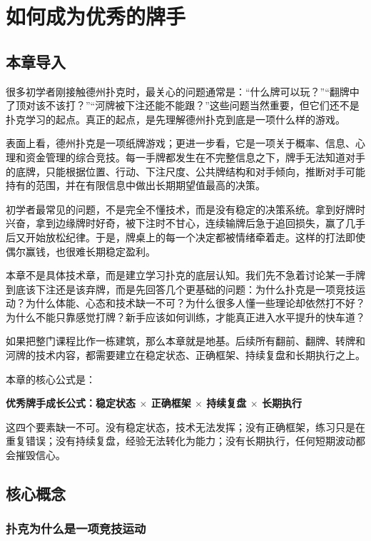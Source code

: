 \chapter{如何成为优秀的牌手}

\section{本章导入}

很多初学者刚接触德州扑克时，最关心的问题通常是：“什么牌可以玩？”“翻牌中了顶对该不该打？”“河牌被下注还能不能跟？”这些问题当然重要，但它们还不是扑克学习的起点。真正的起点，是先理解德州扑克到底是一项什么样的游戏。

表面上看，德州扑克是一项纸牌游戏；更进一步看，它是一项关于概率、信息、心理和资金管理的综合竞技。每一手牌都发生在不完整信息之下，牌手无法知道对手的底牌，只能根据位置、行动、下注尺度、公共牌结构和对手倾向，推断对手可能持有的范围，并在有限信息中做出长期期望值最高的决策。

初学者最常见的问题，不是完全不懂技术，而是没有稳定的决策系统。拿到好牌时兴奋，拿到边缘牌时好奇，被下注时不甘心，连续输牌后急于追回损失，赢了几手后又开始放松纪律。于是，牌桌上的每一个决定都被情绪牵着走。这样的打法即使偶尔赢钱，也很难长期稳定盈利。

本章不是具体技术章，而是建立学习扑克的底层认知。我们先不急着讨论某一手牌到底该下注还是该弃牌，而是先回答几个更基础的问题：为什么扑克是一项竞技运动？为什么体能、心态和技术缺一不可？为什么很多人懂一些理论却依然打不好？为什么不能只靠感觉打牌？新手应该如何训练，才能真正进入水平提升的快车道？

如果把整门课程比作一栋建筑，那么本章就是地基。后续所有翻前、翻牌、转牌和河牌的技术内容，都需要建立在稳定状态、正确框架、持续复盘和长期执行之上。

本章的核心公式是：

\begin{center}
\textbf{优秀牌手成长公式：稳定状态 $\times$ 正确框架 $\times$ 持续复盘 $\times$ 长期执行}
\end{center}

这四个要素缺一不可。没有稳定状态，技术无法发挥；没有正确框架，练习只是在重复错误；没有持续复盘，经验无法转化为能力；没有长期执行，任何短期波动都会摧毁信心。

\section{核心概念}

\subsection{扑克为什么是一项竞技运动}

